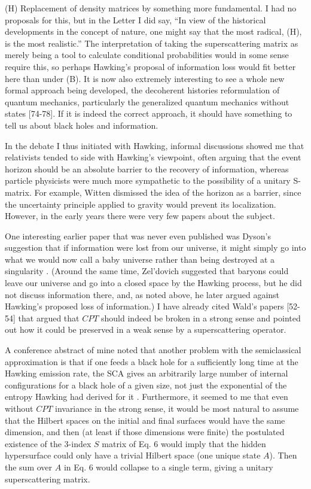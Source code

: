 \documentclass[12pt]{article}
\begin{document}
     (H) Replacement of density matrices by something more
fundamental.  I had
no proposals for this, but in the Letter I did say, ``In view of the
historical
developments in the concept of nature, one might say that the most
radical,
(H), is the most realistic.''  The interpretation of taking the
superscattering
matrix as merely being a tool to calculate conditional probabilities
would in
some sense require this, so perhaps Hawking's proposal of information
loss
would fit better here than under (B).  It is now also extremely
interesting to
see a whole new formal approach being developed, the decoherent
histories
reformulation of quantum mechanics, particularly the generalized
quantum
mechanics without states [74-78].  If it is indeed the
correct approach, it should have something to tell us about black
holes and
information.

     In the debate I thus initiated with Hawking, informal
discussions showed
me that relativists tended to side with Hawking's viewpoint, often
arguing that
the event horizon should be an absolute barrier to the recovery of
information,
whereas particle physicists were much more sympathetic to the
possibility of a
unitary S-matrix.  For example, Witten \cite{Wit81pri} dismissed the
idea of
the horizon as a barrier, since the uncertainty principle applied to
gravity
would prevent its localization.  However, in the early years there
were very
few papers about the subject.

     One interesting earlier paper that was never even published was
Dyson's
suggestion that if information were lost from our universe, it might
simply go
into what we would now call a baby universe rather than being
destroyed at a
singularity \cite{Dys76}.  (Around the same time, Zel'dovich
\cite{Zel77a}
suggested that baryons could leave our universe and go into a closed
space by
the Hawking process, but he did not discuss information there, and,
as noted
above, he later argued \cite{Zel77b} against Hawking's proposed loss
of information.)  I have already cited Wald's papers [52-54]
that argued that $CPT$ should indeed be broken in a strong sense and
pointed
out how it could be preserved in a weak sense by a superscattering
operator.

    A conference abstract of mine \cite{Pag80b} noted that another
problem
with
the semiclassical approximation is that if one feeds a black hole for
a
sufficiently long time at the Hawking emission rate, the SCA gives an
arbitrarily
large number of internal configurations for a black hole of a given
size, not
just
the exponential of the entropy Hawking had derived for it
\cite{Haw75,Haw76a}.
Furthermore, it seemed to me that even without $CPT$ invariance in
the strong
sense, it would be most natural to assume that the Hilbert spaces on
the
initial and final surfaces would have the same dimension, and then
(at least if
those dimensions were finite) the postulated existence of the 3-index
$S$
matrix of Eq. 6 would imply that the hidden hypersurface could only
have a
trivial Hilbert space (one unique state $A$).  Then the sum over $A$
in Eq. 6
would collapse to a single term, giving a unitary superscattering
matrix.
\end{document}
